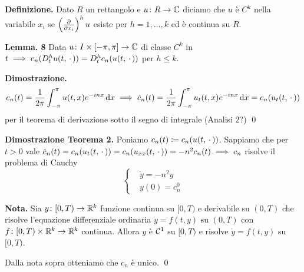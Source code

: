\textbf{Definizione.}
Dato $R$ un rettangolo e $u \colon R \to \mathbb C$ diciamo che $u$ è $C^k$ nella variabile $x_i$ se $\left(\frac{\partial}{\partial x_i}\right)^h u$ esiste per $h = 1, \dots, k$ ed è continua su $R$.

\textbf{Lemma. 8}
Data $u \colon I \times [-\pi, \pi] \to \mathbb C$ di classe $C^k$ in $t \implies c_n(D_t^h u(t, \,\cdot\,)) = D_t^h c_n(u(t, \,\cdot\,))$ per $h \leq k$.

\textbf{Dimostrazione.}
$$
c_n(t) = \frac{1}{2\pi} \int_{-\pi}^\pi u(t, x) e^{-inx} \,\mathrm{d} x
\implies \dot c_n(t) = \frac{1}{2\pi} \int_{-\pi}^\pi u_t(t, x) e^{-inx} \,\mathrm{d} x = c_n(u_t(t, \,\cdot\,))
$$
per il teorema di derivazione sotto il segno di integrale (Analisi 2?)
\qed

\textbf{Dimostrazione Teorema 2.}
Poniamo $c_n(t) \coloneqq c_n(u(t, \,\cdot\,))$. Sappiamo che per $t > 0$ vale $\dot c_n(t) = c_n(u_t(t, \,\cdot\,)) = c_n(u_{xx}(t, \,\cdot\,)) = -n^2 c_n(t) \implies c_n$ risolve il problema di Cauchy
$$
\left\{
\begin{aligned}
	& \dot y = -n^2 y \\
	& y(0) = c_n^0
\end{aligned}
\right.
$$ 

\textbf{Nota.} Sia $y \colon [0,T) \to \mathbb R^k$ funzione continua su $[0,T)$ e derivabile su $(0,T)$ che risolve l'equazione differenziale ordinaria $\dot y = f(t,y)$ su $(0,T)$ con $f\colon  [0,T) \times \mathbb R^k \to \mathbb R^k$ continua.
Allora $y$ è $\mathcal{C}^1$ su $[0,T)$ e risolve $\dot y = f(t,y)$ su $[0,T)$.

Dalla nota sopra otteniamo che $c_n$ è unico.
\qed










